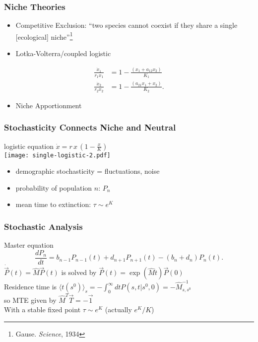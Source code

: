 \documentclass[dvipsnames]{beamer}
\begin{document}
\begin{frame}
\frametitle{Niche Theories}
\begin{itemize}
\item Competitive Exclusion: ``two species cannot coexist if they share a single [ecological] niche''\footnote{Gause. \emph{Science}, 1934}
\pause
\item Lotka-Volterra/coupled logistic
\end{itemize}
\begin{align*}
\frac{\dot{x}_1}{r_1 x_1} &= 1 - \frac{(x_1 + a_{12}x_2)}{K_1} \\
\frac{\dot{x}_2}{r_2 x_2} &= 1 - \frac{(a_{21}x_1 + x_2)}{K_2}. 
\end{align*}
\pause
\begin{itemize}
\item Niche Apportionment
\end{itemize}
\end{frame}


\begin{frame}
\frametitle{Stochasticity Connects Niche and Neutral}
\centering
logistic equation $\dot{x} = r \, x \, \left(1-\frac{x}{K}\right)$ \\
\texttt{[image: single-logistic-2.pdf]}
\begin{itemize}
	\item demographic stochasticity = fluctuations, noise
	\pause
	\item probability of population $n$: $P_n$
	\item mean time to extinction: $\tau \sim e^K$ %
\end{itemize}
\end{frame}
\fi

\begin{frame}
\frametitle{Stochastic Analysis}
Master equation
\begin{equation*}
\frac{dP_n}{dt} =  b_{n-1}P_{n-1}(t) + d_{n+1}P_{n+1}(t) - (b_n+d_n)P_n(t).
\end{equation*}
\pause
$\dot{\vec{P}}(t) = \hat{M}\vec{P}(t)$ is solved by $\vec{P}(t)=\exp\left(\hat{M}t\right)\vec{P}(0)$ \\
\pause
Residence time is $\langle t(s^0)\rangle_s = -\int_0^{\infty} dt P(s,t|s^0,0) = -\hat{M}^{-1}_{s,s^0}$ \\
so MTE given by $\hat{M}^T\vec{T}=-\vec{1}$ \\
\pause
With a stable fixed point $\tau \sim e^K$ (actually $e^K/K$)
\end{frame}
\end{document}
